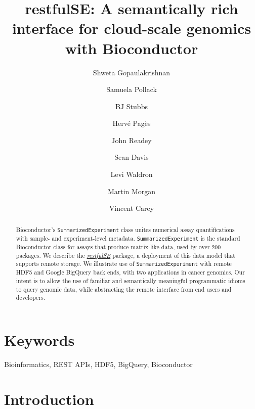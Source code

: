 \documentclass[9pt,a4paper,]{extarticle}
\begin{document}
\pagestyle{front}

\title{restfulSE: A semantically rich interface for cloud-scale genomics with Bioconductor}

\author[1]{Shweta Gopaulakrishnan}
\author[2]{Samuela Pollack}
\author[1]{BJ Stubbs}
\author[3]{Herv\'e Pag\`es}
\author[4]{John Readey}
\author[5]{Sean Davis}
\author[6]{Levi Waldron}
\author[7]{Martin Morgan}
\author[1]{Vincent Carey}

\maketitle
\thispagestyle{front}

\begin{abstract}
Bioconductor's \texttt{SummarizedExperiment} class unites numerical assay quantifications with sample- and experiment-level metadata. \texttt{SummarizedExperiment} is the standard Bioconductor class for assays that produce matrix-like data, used by over 200 packages. We describe the \emph{\href{https://bioconductor.org/packages/3.9/restfulSE}{restfulSE}} package, a deployment of this data model that supports remote storage. We illustrate use of \texttt{SummarizedExperiment} with remote HDF5 and Google BigQuery back ends, with two applications in cancer genomics. Our intent is to allow the use of familiar and semantically meaningful programmatic idioms to query genomic data, while abstracting the remote interface from end users and developers.
\end{abstract}

\section*{Keywords}
Bioinformatics, REST APIs, HDF5, BigQuery, Bioconductor


\clearpage
\pagestyle{main}

\section{Introduction}\label{introduction}
\end{document}
